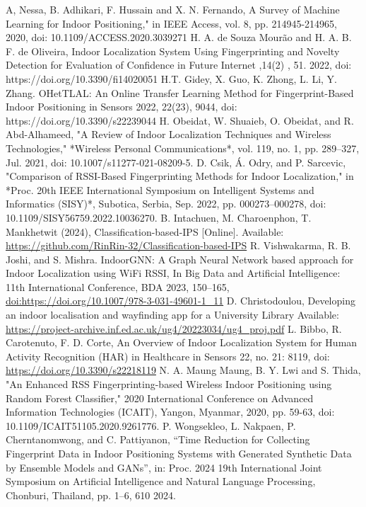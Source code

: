 \documentclass[conference]{IEEEtran}
\begin{document}
	
	\begin{thebibliography}{00}
		 A, Nessa, B. Adhikari, F. Hussain and X. N. Fernando, A Survey of Machine Learning for Indoor Positioning," in IEEE Access, vol. 8, pp. 214945-214965, 2020, doi: 10.1109/ACCESS.2020.3039271
		 H. A. de Souza Mourão and H. A. B. F. de Oliveira, Indoor Localization System Using Fingerprinting and Novelty Detection for Evaluation of Confidence in Future Internet ,14(2) , 51. 2022, doi:  https://doi.org/10.3390/fi14020051 
		 H.T. Gidey, X. Guo, K. Zhong, L. Li, Y. Zhang. OHetTLAL: An Online Transfer Learning Method for Fingerprint-Based Indoor Positioning in  Sensors 2022, 22(23), 9044, doi: https://doi.org/10.3390/s22239044
		 H. Obeidat, W. Shuaieb, O. Obeidat, and R. Abd-Alhameed, "A Review of Indoor Localization Techniques and Wireless Technologies," *Wireless Personal Communications*, vol. 119, no. 1, pp. 289–327, Jul. 2021, doi: 10.1007/s11277-021-08209-5.
		 D. Csik, Á. Odry, and P. Sarcevic, "Comparison of RSSI-Based Fingerprinting Methods for Indoor Localization," in *Proc. 20th IEEE International Symposium on Intelligent Systems and Informatics (SISY)*, Subotica, Serbia, Sep. 2022, pp. 000273–000278, doi: 10.1109/SISY56759.2022.10036270.
		 B. Intachuen, M. Charoenphon, T. Mankhetwit (2024), Classification-based-IPS [Online]. Available: \url{https://github.com/RinRin-32/Classification-based-IPS}
		 R. Vishwakarma, R. B. Joshi, and S. Mishra. IndoorGNN: A Graph Neural Network based approach for Indoor Localization using WiFi RSSI, In Big Data and Artificial Intelligence: 11th International Conference, BDA 2023, 150–165, \url{doi:https://doi.org/10.1007/978-3-031-49601-1_11}
		 D. Christodoulou,  Developing an indoor localisation and wayfinding app for a University Library Available: \url{https://project-archive.inf.ed.ac.uk/ug4/20223034/ug4_proj.pdf}
		 L. Bibbo, R. Carotenuto, F. D. Corte, An Overview of Indoor Localization System for Human Activity Recognition (HAR) in Healthcare in Sensors 22, no. 21: 8119, doi: \url{https://doi.org/10.3390/s22218119}
		N. A. Maung Maung, B. Y. Lwi and S. Thida, "An Enhanced RSS Fingerprinting-based Wireless Indoor Positioning using Random Forest Classifier," 2020 International Conference on Advanced Information Technologies (ICAIT), Yangon, Myanmar, 2020, pp. 59-63, doi: 10.1109/ICAIT51105.2020.9261776.
		P. Wongsekleo, L. Nakpaen, P. Cherntanomwong, and C. Pattiyanon, “Time Reduction for Collecting Fingerprint Data in Indoor Positioning Systems with Generated Synthetic Data by Ensemble Models and GANs”, in: Proc. 2024 19th International Joint Symposium on Artificial Intelligence and Natural Language Processing, Chonburi, Thailand, pp. 1–6, 610 2024. 

\end{thebibliography}
\end{document}
